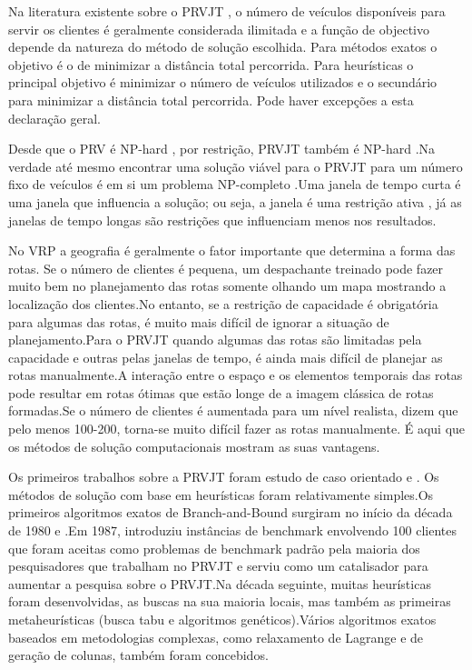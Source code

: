 Na literatura existente sobre o PRVJT , o número de veículos disponíveis para servir os clientes é geralmente considerada ilimitada e a função de objectivo depende da natureza do método de solução escolhida. Para métodos exatos o objetivo é o de minimizar a distância total percorrida. Para heurísticas o principal objetivo é minimizar o número de veículos utilizados e o secundário para minimizar a distância total percorrida. Pode haver excepções a esta declaração geral.



Desde que o PRV é NP-hard , por restrição, PRVJT também é NP-hard \cite{laporte13}.Na verdade até mesmo encontrar uma solução viável para o PRVJT para um número fixo de veículos é em si um problema NP-completo \cite{savelsbergh95}.Uma janela de tempo curta é uma janela que influencia a solução; ou seja, a janela é uma restrição ativa , já as janelas de tempo longas são restrições que influenciam menos nos resultados.



No VRP a geografia é geralmente o fator importante que determina a forma das rotas. Se o número de clientes é pequena, um despachante treinado pode fazer muito bem no planejamento das rotas somente olhando um mapa mostrando a localização dos clientes.No entanto, se a restrição de capacidade é obrigatória para algumas das rotas, é muito mais difícil de ignorar a situação de planejamento.Para o PRVJT quando algumas das rotas são limitadas pela capacidade e outras pelas janelas de tempo, é ainda mais difícil de planejar as rotas manualmente.A interação entre o espaço e os elementos temporais das rotas pode resultar em rotas ótimas que estão longe de a imagem clássica de rotas formadas.Se o número de clientes é aumentada para um nível realista, dizem que pelo menos 100-200, torna-se muito difícil fazer as rotas manualmente. É aqui que os métodos de solução computacionais mostram as suas vantagens\cite{laporte13}.


Os primeiros trabalhos sobre a PRVJT foram estudo de caso orientado \cite{pullen67} e \cite{knight68}. Os métodos de solução com base em heurísticas foram relativamente simples.Os primeiros algoritmos exatos de Branch-and-Bound surgiram no início da década de 1980 \cite{laporte13} e \cite{kolen87}.Em 1987, \cite{solomon87} introduziu instâncias de benchmark envolvendo 100 clientes que foram aceitas como problemas de benchmark padrão pela maioria dos pesquisadores que trabalham no PRVJT e serviu como um catalisador para aumentar a pesquisa sobre o PRVJT.Na década seguinte, muitas heurísticas foram desenvolvidas, as buscas na sua maioria locais, mas também as primeiras metaheurísticas (busca tabu e algoritmos genéticos).Vários algoritmos exatos baseados em metodologias complexas, como relaxamento de Lagrange e de geração de colunas, também foram concebidos.



